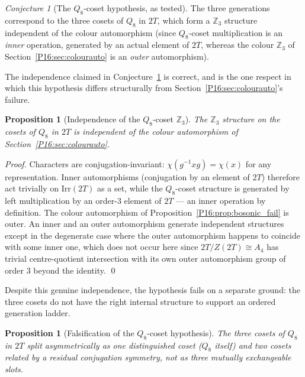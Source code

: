 \documentclass[11pt,a4paper]{article}
\newtheorem{proposition}[theorem]{Proposition}
\theoremstyle{definition}\newtheorem{definition}[theorem]{Definition}
\theoremstyle{remark}
\newtheorem{conjecture}[theorem]{Conjecture}
\theoremstyle{definition}\newtheorem{construction}[theorem]{Construction}
\newcommand{\twoT}{2T}
\begin{document}
\begin{conjecture}[The $Q_8$-coset hypothesis, as tested]
\label{P16:conj:q8}
The three generations correspond to the three cosets of $Q_8$ in
$\twoT$, which form a $\mathbb{Z}_3$ structure independent of the
colour automorphism (since $Q_8$-coset multiplication is an
\emph{inner} operation, generated by an actual element of $\twoT$,
whereas the colour $\mathbb{Z}_3$ of Section~\ref{P16:sec:colourauto} is
an \emph{outer} automorphism).
\end{conjecture}

The independence claimed in Conjecture~\ref{P16:conj:q8} is correct, and
is the one respect in which this hypothesis differs structurally from
Section~\ref{P16:sec:colourauto}'s failure.

\begin{proposition}[Independence of the $Q_8$-coset $\mathbb{Z}_3$]
\label{P16:prop:q8_independent}
The $\mathbb{Z}_3$ structure on the cosets of $Q_8$ in $\twoT$ is
independent of the colour automorphism of Section~\ref{P16:sec:colourauto}.
\end{proposition}
\begin{proof}
Characters are conjugation-invariant: $\chi(g^{-1}xg)=\chi(x)$ for any
representation. Inner automorphisms (conjugation by an element of
$\twoT$) therefore act trivially on $\mathrm{Irr}(\twoT)$ as a set,
while the $Q_8$-coset structure is generated by left multiplication by
an order-$3$ element of $\twoT$ --- an inner operation by definition.
The colour automorphism of Proposition~\ref{P16:prop:bosonic_fail} is
outer. An inner and an outer automorphism generate independent
structures except in the degenerate case where the outer automorphism
happens to coincide with some inner one, which does not occur here
since $\twoT/Z(\twoT)\cong A_4$ has trivial centre-quotient
intersection with its own outer automorphism group of order $3$
beyond the identity.
\qed
\end{proof}

Despite this genuine independence, the hypothesis fails on a separate
ground: the three cosets do not have the right internal structure to
support an ordered generation ladder.

\begin{proposition}[Falsification of the $Q_8$-coset hypothesis]
\label{P16:prop:q8_fail}
The three cosets of $Q_8$ in $\twoT$ split asymmetrically as one
distinguished coset ($Q_8$ itself) and two cosets related by a
residual conjugation symmetry, not as three mutually exchangeable
slots.
\end{proposition}
\end{document}
